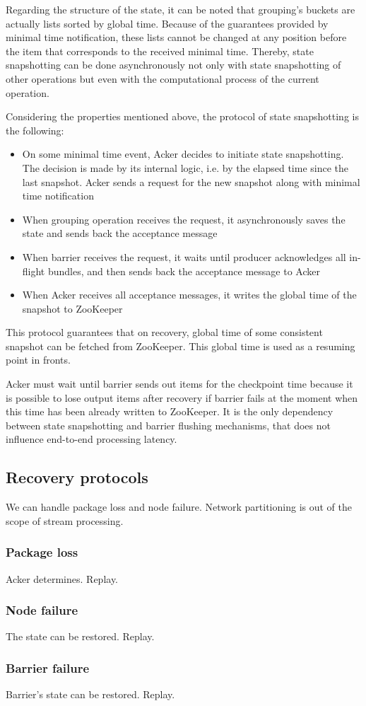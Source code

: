Regarding the structure of the state, it can be noted that grouping's buckets are actually lists sorted by global time. Because of the guarantees provided by minimal time notification, these lists cannot be changed at any position before the item that corresponds to the received minimal time. Thereby, state snapshotting can be done asynchronously not only with state snapshotting of other operations but even with the computational process of the current operation. 

Considering the properties mentioned above, the protocol of state snapshotting is the following:

\begin{itemize}
    \item On some minimal time event, Acker decides to initiate state snapshotting. The decision is made by its internal logic, i.e. by the elapsed time since the last snapshot. Acker sends a request for the new snapshot along with minimal time notification
    \item When grouping operation receives the request, it asynchronously saves the state and sends back the acceptance message
    \item When barrier receives the request, it waits until producer acknowledges all in-flight bundles, and then sends back the acceptance message to Acker
    \item When Acker receives all acceptance messages, it writes the global time of the snapshot to ZooKeeper 
\end{itemize}

This protocol guarantees that on recovery, global time of some consistent snapshot can be fetched from ZooKeeper. This global time is used as a resuming point in fronts. 

Acker must wait until barrier sends out items for the checkpoint time because it is possible to lose output items after recovery if barrier fails at the moment when this time has been already written to ZooKeeper. It is the only dependency between state snapshotting and barrier flushing mechanisms, that does not influence end-to-end processing latency. 

\subsection{Recovery protocols}
We can handle package loss and node failure. Network partitioning is out of the scope of stream processing.

\subsubsection{Package loss}
Acker determines. Replay.

\subsubsection{Node failure}
The state can be restored. Replay.

\subsubsection{Barrier failure}
Barrier's state can be restored. Replay.